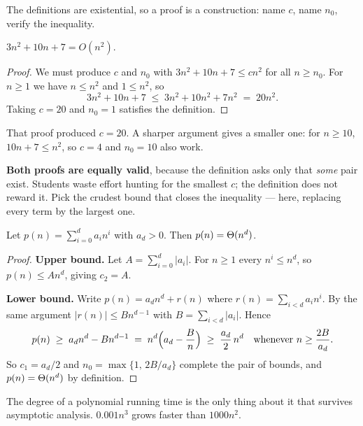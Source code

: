 The definitions are existential, so a proof is a construction: name $c$, name
$n_{0}$, verify the inequality.

\begin{theorem}[A quadratic is $O(n^{2})$]
$3n^{2} + 10n + 7 = O(n^{2})$.
\end{theorem}

\begin{proof}
We must produce $c$ and $n_{0}$ with $3n^{2} + 10n + 7 \le cn^{2}$ for all
$n \ge n_{0}$. For $n \ge 1$ we have $n \le n^{2}$ and $1 \le n^{2}$, so
\[ 3n^{2} + 10n + 7 \;\le\; 3n^{2} + 10n^{2} + 7n^{2} \;=\; 20n^{2}. \]
Taking $c = 20$ and $n_{0} = 1$ satisfies the definition.
\end{proof}

\begin{conceptbox}
That proof produced $c = 20$. A sharper argument gives a smaller one: for
$n \ge 10$, $10n + 7 \le n^{2}$, so $c = 4$ and $n_{0} = 10$ also work.

\smallskip
\textbf{Both proofs are equally valid}, because the definition asks only that
\emph{some} pair exist. Students waste effort hunting for the smallest $c$; the
definition does not reward it. Pick the crudest bound that closes the
inequality --- here, replacing every term by the largest one.
\end{conceptbox}

\begin{lemma}[Polynomials]\label{lem:poly}
Let $p(n) = \sum_{i=0}^{d} a_{i} n^{i}$ with $a_{d} > 0$. Then
$p(n) = \Theta(n^{d})$.
\end{lemma}

\begin{proof}
\textbf{Upper bound.} Let $A = \sum_{i=0}^{d} |a_{i}|$. For $n \ge 1$ every
$n^{i} \le n^{d}$, so $p(n) \le A n^{d}$, giving $c_{2} = A$.

\smallskip
\textbf{Lower bound.} Write $p(n) = a_{d}n^{d} + r(n)$ where
$r(n) = \sum_{i<d} a_{i}n^{i}$. By the same argument $|r(n)| \le B n^{d-1}$
with $B = \sum_{i<d}|a_{i}|$. Hence
\[ p(n) \;\ge\; a_{d}n^{d} - Bn^{d-1}
   \;=\; n^{d}\Bigl(a_{d} - \frac{B}{n}\Bigr)
   \;\ge\; \frac{a_{d}}{2}\,n^{d}
   \quad\text{whenever } n \ge \frac{2B}{a_{d}}. \]
So $c_{1} = a_{d}/2$ and $n_{0} = \max\{1,\, 2B/a_{d}\}$ complete the pair of
bounds, and $p(n) = \Theta(n^{d})$ by definition.
\end{proof}

\begin{corollary}
The degree of a polynomial running time is the only thing about it that
survives asymptotic analysis. $0.001n^{3}$ grows faster than $1000n^{2}$.
\end{corollary}


